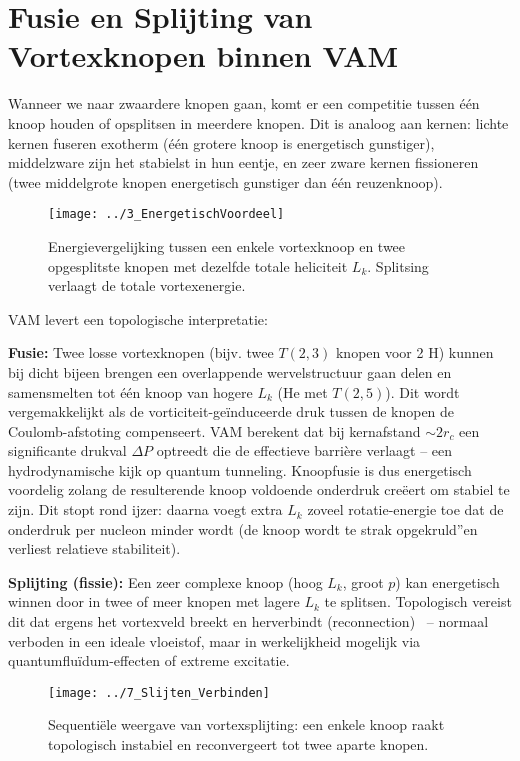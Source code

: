 \section{Fusie en Splijting van Vortexknopen binnen VAM}

Wanneer we naar zwaardere knopen gaan, komt er een competitie tussen één knoop houden of opsplitsen in meerdere knopen. Dit is analoog aan kernen: lichte kernen fuseren exotherm (één grotere knoop is energetisch gunstiger), middelzware zijn het stabielst in hun eentje, en zeer zware kernen fissioneren (twee middelgrote knopen energetisch gunstiger dan één reuzenknoop).

\begin{figure}[H]
    \centering
    \texttt{[image: ../3\_EnergetischVoordeel]}
    \caption{Energievergelijking tussen een enkele vortexknoop en twee opgesplitste knopen met dezelfde totale heliciteit $L_k$. Splitsing verlaagt de totale vortexenergie.}
    \label{fig:fusie_splitsing}
\end{figure}

VAM levert een topologische interpretatie:

\textbf{Fusie:} Twee losse vortexknopen (bijv. twee $T(2,3)$ knopen voor 2 H) kunnen bij dicht bijeen brengen een overlappende wervelstructuur gaan delen en samensmelten tot één knoop van hogere $L_k$ (He met $T(2,5)$). Dit wordt vergemakkelijkt als de vorticiteit-geïnduceerde druk tussen de knopen de Coulomb-afstoting compenseert. VAM berekent dat bij kernafstand $\sim 2r_c$ een significante drukval $\Delta P$ optreedt die de effectieve barrière verlaagt – een hydrodynamische kijk op quantum tunneling. Knoopfusie is dus energetisch voordelig zolang de resulterende knoop voldoende onderdruk creëert om stabiel te zijn. Dit stopt rond ijzer: daarna voegt extra $L_k$ zoveel rotatie-energie toe dat de onderdruk per nucleon minder wordt (de knoop wordt \grqq te strak opgekruld\textquotedblright en verliest relatieve stabiliteit).

\textbf{Splijting (fissie):} Een zeer complexe knoop (hoog $L_k$, groot $p$) kan energetisch winnen door in twee of meer knopen met lagere $L_k$
te splitsen. Topologisch vereist dit dat ergens het vortexveld breekt en herverbindt (reconnection)~\cite{Kleckner2013KnotsVortex} – normaal verboden in een ideale vloeistof, maar in werkelijkheid mogelijk via quantumfluïdum-effecten of extreme excitatie.
\begin{figure}[H]
    \centering
    \texttt{[image: ../7\_Slijten\_Verbinden]}
    \caption{Sequentiële weergave van vortexsplijting: een enkele knoop raakt topologisch instabiel en reconvergeert tot twee aparte knopen.}
    \label{fig:reconnectie_splijting}
\end{figure}

